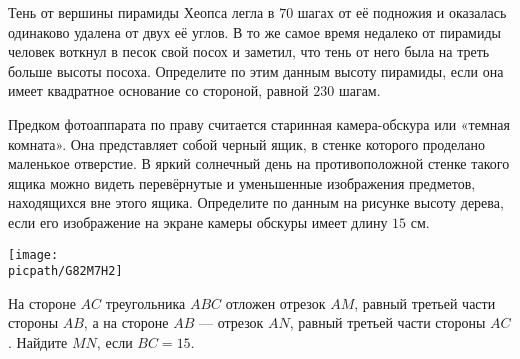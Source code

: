 \begin{homework}[number=2]
	\begin{listofex}
		\item Тень от вершины пирамиды Хеопса легла	в \( 70 \) шагах от её подножия и оказалась	одинаково удалена от двух её углов. В то же самое время недалеко от пирамиды человек воткнул в песок свой посох и	заметил, что тень от него была на треть	больше высоты посоха. Определите по	этим данным высоту пирамиды, если она имеет квадратное основание со стороной, равной \( 230 \) шагам.
		\item Предком фотоаппарата по праву считается старинная камера-обскура или «темная комната». Она представляет собой черный ящик, в стенке которого проделано маленькое отверстие. В яркий солнечный
		день на противоположной стенке такого ящика можно видеть перевёрнутые и	уменьшенные изображения предметов, находящихся вне этого ящика. Определите по данным на рисунке высоту дерева, если его изображение на экране камеры обскуры имеет длину \( 15 \) см.
		\begin{center}
			\texttt{[image: \\picpath/G82M7H2]}
		\end{center}
		\item На стороне \( AC \) треугольника \( ABC \) отложен отрезок \( AM \), равный третьей части стороны \( AB \), а на стороне \( AB \) --- отрезок \( AN \), равный третьей части стороны \( AC \). Найдите \( MN \), если \( BC=15 \).
	\end{listofex}
\end{homework}

